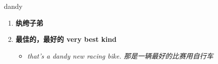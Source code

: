 
\begin{frame}
{\huge dandy}
\begin{center}
\begin{enumerate}\Large
  \item \textbf{纨绔子弟}
  \item \textbf{最佳的，最好的 very best kind}
  \begin{itemize}
    \item \em{\Large{that's a dandy new racing bike. 那是一辆最好的比赛用自行车}}
  \end{itemize}
\end{enumerate}
\end{center}
\end{frame}

